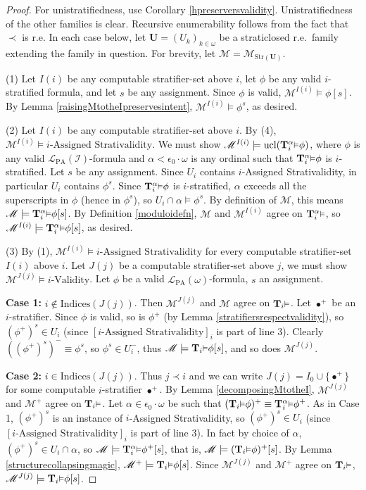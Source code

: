 \documentclass[reqno]{article}
\theoremstyle{definition}
\def\L{\mathscr{L}}
\def\M{\mathscr{M}}
\def\T{\mathbf{T}}
\def\U{\mathbf{U}}
\def\indices{\mathrm{Indices}}
\def\LPA{\L_{\mathrm{PA}}}
\def\epom{\epsilon_0\cdot\omega}
\def\indset{\mathcal I}
\renewcommand{\Pr}[1]{\T_{#1}\mbox{\small${\vDash}$}}
\newcommand{\Prr}[2]{\T^{#1}_{#2}\mbox{\small${\vDash}$}}
\newcommand{\ucl}[1]{\mathrm{ucl}(#1)}
\newcommand{\case}[1]{\textbf{Case #1:}}
\newcommand{\str}[1]{\mathrm{Str}(#1)} \newcommand{\Str}[1]{\str{#1}}
\begin{document}
\begin{proof}
For unistratifiedness, use Corollary \ref{hpreserversvalidity}.
Unistratifiedness of the other families is clear.
Recursive enumerability follows from the fact that $\prec$ is r.e.
In each case below, let $\U=(U_k)_{k\in\omega}$ be a straticlosed r.e.~family
extending the family in question. For brevity, let $\M=\M_{\str\U}$.

\item
(1)
Let $I(i)$ be any computable stratifier-set above $i$, let $\phi$ be any
valid $i$-stratified formula, and let $s$ be any assignment.
Since $\phi$ is valid, $\M^{I(i)}\models \phi[s]$.
By Lemma \ref{raisingMtotheIpreservesintent}, $\M^{I(i)}\models\phi^s$,
as desired.

\item
(2)
Let $I(i)$ be any computable stratifier-set above $i$.
By (4), $\M^{I(i)}\models \mbox{$i$-Assigned Strativalidity}$.
We must show $\M^{I(i)}\models \ucl{\Prr\alpha i\phi}$, where $\phi$
is any valid $\LPA(\indset)$-formula and $\alpha<\epom$ is any ordinal
such that $\Prr\alpha i\phi$ is $i$-stratified.
Let $s$ be any assignment. Since $U_i$ contains
$i$-Assigned Strativalidity, in particular $U_i$ contains $\phi^s$.
Since $\Prr\alpha i\phi$ is $i$-stratified, $\alpha$ exceeds all the
superscripts in $\phi$ (hence in $\phi^s$), so $U_i\cap\alpha\models \phi^s$.
By definition of $\M$, this means $\M\models\Prr\alpha i\phi[s]$.
By Definition \ref{moduloidefn}, $\M$ and $\M^{I(i)}$ agree on $\Prr\alpha i$,
so $\M^{I(i)}\models\Prr\alpha i\phi[s]$, as desired.

\item
(3)
By (1), $\M^{I(i)}\models\mbox{$i$-Assigned Strativalidity}$
for every computable stratifier-set $I(i)$ above $i$.
Let $J(j)$ be a computable stratifier-set above $j$, we must
show $\M^{J(j)}\models \mbox{$i$-Validity}$.
Let $\phi$ be a valid $\LPA(\omega)$-formula, $s$
an assignment.

\item
\case1
$i\not\in\indices(J(j))$.
Then $\M^{J(j)}$ and $\M$ agree on $\Pr i$.
Let $\bullet^+$ be an $i$-stratifier.
Since $\phi$ is valid, so is $\phi^+$
(by Lemma \ref{stratifiersrespectvalidity}),
so $(\phi^+)^s\in U_i$ (since $[\mbox{$i$-Assigned Strativalidity}]_i$ is
part of line 3).
Clearly $((\phi^+)^s)^-\equiv\phi^s$, so $\phi^s\in U^-_i$,
thus $\M\models \Pr i\phi[s]$, and so does $\M^{J(j)}$.

\item
\case2
$i\in\indices(J(j))$.
Thus $j\prec i$ and we can write $J(j)=I_0\cup\{\bullet^+\}$
for some computable $i$-stratifier $\bullet^+$.
By Lemma \ref{decomposingMtotheI}, $\M^{J(j)}$ and
$\M^+$ agree on $\Pr i$.
Let $\alpha\in\epom$ be such that
$(\Pr i\phi)^+\equiv \Prr\alpha i\phi^+$.
As in Case 1, $(\phi^+)^s$ is an instance of
$i$-Assigned Strativalidity,
so $(\phi^+)^s\in U_i$
(since $[\mbox{$i$-Assigned Strativalidity}]_i$ is
part of line 3).
In fact by choice of $\alpha$, $(\phi^+)^s\in U_i\cap \alpha$,
so $\M\models \Prr\alpha i\phi^+[s]$,
that is, $\M\models (\Pr i\phi)^+[s]$.
By Lemma \ref{structurecollapsingmagic},
$\M^+\models\Pr i\phi[s]$.
Since $\M^{J(j)}$ and $\M^+$ agree on $\Pr i$,
$\M^{J(j)}\models\Pr i\phi[s]$.
\end{proof}
\end{document}
